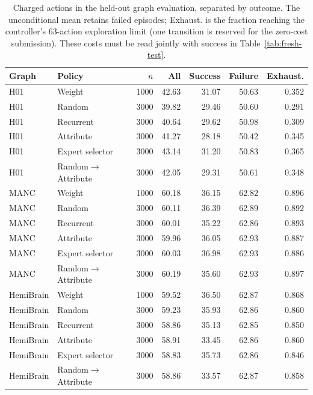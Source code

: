 \begin{table}[t]
\centering\scriptsize
\setlength{\tabcolsep}{3pt}
\caption{Charged actions in the held-out graph evaluation, separated by outcome. The unconditional mean retains failed episodes; Exhaust. is the fraction reaching the controller's 63-action exploration limit (one transition is reserved for the zero-cost submission). These costs must be read jointly with success in Table~\ref{tab:fresh-test}.}
\label{tab:graph-costs}
\begin{tabular}{llrrrrr}
\toprule
Graph & Policy & $n$ & All & Success & Failure & Exhaust. \\
\midrule
H01 & Weight & 1000 & 42.63 & 31.07 & 50.63 & 0.352 \\
H01 & Random & 3000 & 39.82 & 29.46 & 50.60 & 0.291 \\
H01 & Recurrent & 3000 & 40.64 & 29.62 & 50.98 & 0.309 \\
H01 & Attribute & 3000 & 41.27 & 28.18 & 50.42 & 0.345 \\
H01 & Expert selector & 3000 & 43.14 & 31.20 & 50.83 & 0.365 \\
H01 & Random$\rightarrow$Attribute & 3000 & 42.05 & 29.31 & 50.61 & 0.348 \\
\midrule
MANC & Weight & 1000 & 60.18 & 36.15 & 62.82 & 0.896 \\
MANC & Random & 3000 & 60.11 & 36.39 & 62.89 & 0.892 \\
MANC & Recurrent & 3000 & 60.01 & 35.22 & 62.86 & 0.893 \\
MANC & Attribute & 3000 & 59.96 & 36.05 & 62.93 & 0.887 \\
MANC & Expert selector & 3000 & 60.03 & 36.98 & 62.93 & 0.886 \\
MANC & Random$\rightarrow$Attribute & 3000 & 60.19 & 35.60 & 62.93 & 0.897 \\
\midrule
HemiBrain & Weight & 1000 & 59.52 & 36.50 & 62.87 & 0.868 \\
HemiBrain & Random & 3000 & 59.23 & 35.93 & 62.86 & 0.860 \\
HemiBrain & Recurrent & 3000 & 58.86 & 35.13 & 62.85 & 0.850 \\
HemiBrain & Attribute & 3000 & 58.91 & 33.45 & 62.86 & 0.860 \\
HemiBrain & Expert selector & 3000 & 58.83 & 35.73 & 62.86 & 0.846 \\
HemiBrain & Random$\rightarrow$Attribute & 3000 & 58.86 & 33.57 & 62.87 & 0.858 \\
\bottomrule
\end{tabular}
\end{table}
